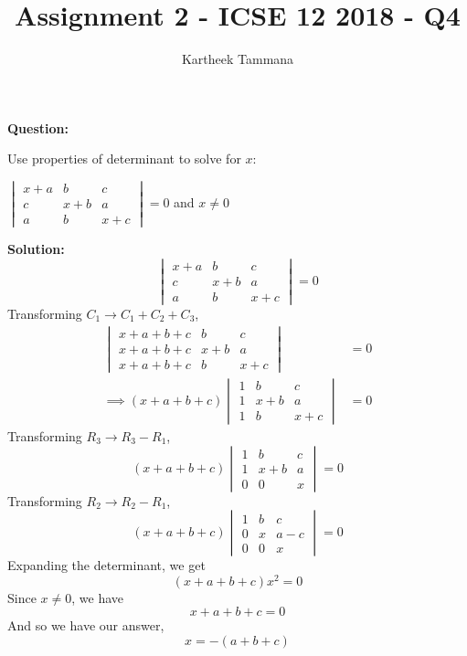 \documentclass[journal, 12pt, twocolumn]{IEEEtran}
\title{Assignment 2 - ICSE 12 2018 - Q4}
\author{Kartheek Tammana}
\begin{document}
\newcommand{\mydet}[1]{\ensuremath{\begin{vmatrix}#1\end{vmatrix}}}

\maketitle

\textbf{Question:}

Use properties of determinant to solve for $x$:

\begin{center}
    $\mydet{ x + a & b & c \\ c & x + b & a \\ a & b & x + c } = 0$ and $x \neq 0$
\end{center}

\textbf{Solution:}
\begin{equation}
    \mydet{
        x + a & b & c \\
        c & x + b & a \\
        a & b & x + c
    } = 0
\end{equation}
    Transforming $C_1 \rightarrow C_1 + C_2 + C_3$,
\begin{align}
    \mydet{
        x + a + b + c & b & c \\
        x + a + b + c & x + b & a \\
        x + a + b + c & b & x + c
    } &= 0 \\
    \implies (x + a + b + c)
    \mydet{
        1 & b & c \\
        1 & x + b & a \\
        1 & b & x + c
    } &= 0
\end{align}
    Transforming $R_3 \rightarrow R_3 - R_1$,
\begin{equation}
    (x + a + b + c)
    \mydet{
        1 & b & c \\
        1 & x + b & a \\
        0 & 0 & x
    } = 0
\end{equation}
    Transforming $R_2 \rightarrow R_2 - R_1$,
\begin{equation}
    (x + a + b + c)
    \mydet{
        1 & b & c \\
        0 & x & a - c \\
        0 & 0 & x
    } = 0
\end{equation}
Expanding the determinant, we get
\begin{equation}
    (x + a + b + c)x^2 = 0
\end{equation}
Since $x \neq 0$, we have
\begin{equation}
    x + a + b + c = 0
\end{equation}
And so we have our answer,
\begin{equation}
    x = -(a + b + c)
\end{equation}
\end{document}
